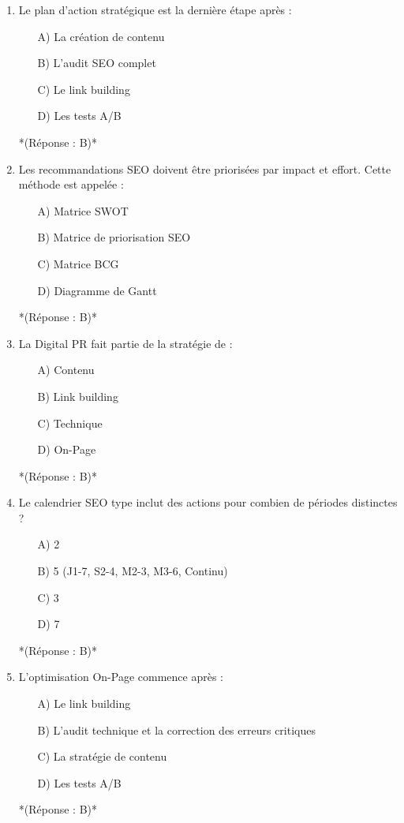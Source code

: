 \documentclass[12pt,a4paper,twoside]{report}
\begin{document}
\begin{enumerate}
    \item Le plan d'action stratégique est la dernière étape après :
    \begin{itemize}
        \item[A)] La création de contenu
        \item[B)] L'audit SEO complet
        \item[C)] Le link building
        \item[D)] Les tests A/B
    \end{itemize}
    *(Réponse : B)*

    \item Les recommandations SEO doivent être priorisées par impact et effort. Cette méthode est appelée :
    \begin{itemize}
        \item[A)] Matrice SWOT
        \item[B)] Matrice de priorisation SEO
        \item[C)] Matrice BCG
        \item[D)] Diagramme de Gantt
    \end{itemize}
    *(Réponse : B)*

    \item La Digital PR fait partie de la stratégie de :
    \begin{itemize}
        \item[A)] Contenu
        \item[B)] Link building
        \item[C)] Technique
        \item[D)] On-Page
    \end{itemize}
    *(Réponse : B)*

    \item Le calendrier SEO type inclut des actions pour combien de périodes distinctes ?
    \begin{itemize}
        \item[A)] 2
        \item[B)] 5 (J1-7, S2-4, M2-3, M3-6, Continu)
        \item[C)] 3
        \item[D)] 7
    \end{itemize}
    *(Réponse : B)*

    \item L'optimisation On-Page commence après :
    \begin{itemize}
        \item[A)] Le link building
        \item[B)] L'audit technique et la correction des erreurs critiques
        \item[C)] La stratégie de contenu
        \item[D)] Les tests A/B
    \end{itemize}
    *(Réponse : B)*


\end{enumerate}
\end{document}
